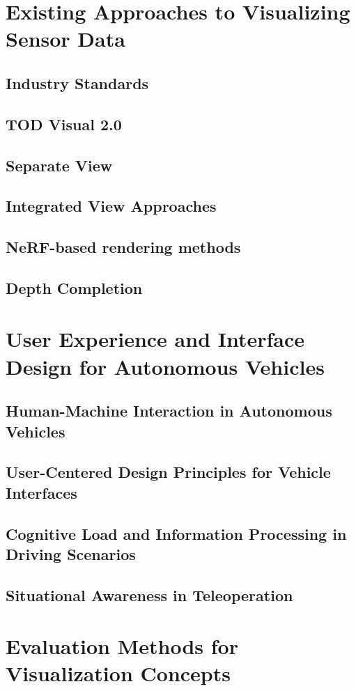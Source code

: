 \section{Existing Approaches to Visualizing Sensor Data}
\subsection{Industry Standards}
\subsection{TOD Visual 2.0}
\subsection{Separate View}
\subsection{Integrated View Approaches}
\subsection{NeRF-based rendering methods}
\subsection{Depth Completion}

\section{User Experience and Interface Design for Autonomous Vehicles}
\subsection{Human-Machine Interaction in Autonomous Vehicles}
\subsection{User-Centered Design Principles for Vehicle Interfaces}
\subsection{Cognitive Load and Information Processing in Driving Scenarios}
\subsection{Situational Awareness in Teleoperation}

\section{Evaluation Methods for Visualization Concepts}
